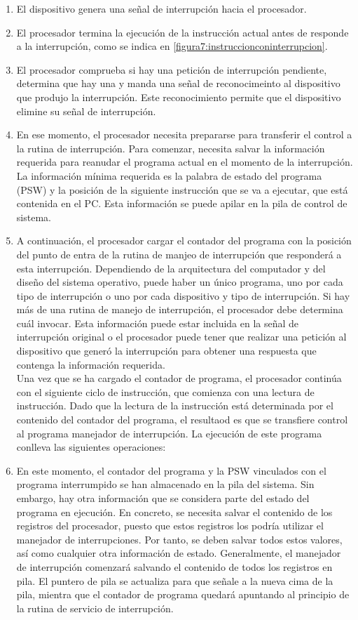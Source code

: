\documentclass{article}
\begin{document}
						\begin{enumerate}
							\item El dispositivo genera una señal de interrupción hacia el procesador.
							\item El procesador termina la ejecución de la instrucción actual antes de responde a la interrupción, como se indica en \ref{figura7:instruccionconinterrupcion}.
							\item El procesador comprueba si hay una petición de interrupción pendiente, determina que hay una y manda una señal de reconocimeinto al dispositivo que produjo la interrupción. Este reconocimiento permite que el dispositivo elimine su señal de interrupción.
							\item En ese momento, el procesador necesita prepararse para transferir el control a la rutina de interrupción. Para comenzar, necesita salvar la información requerida para reanudar el programa actual en el momento de la interrupción. La información mínima requerida es la palabra de estado del programa (PSW) y la posición de la siguiente instrucción que se va a ejecutar, que está contenida en el PC. Esta información se puede apilar en la pila de control de sistema.
							\item A continuación, el procesador cargar el contador del programa con la posición del punto de entra de la rutina de manjeo de interrupción que responderá a esta interrupción. Dependiendo de la arquitectura del computador y del diseño del sistema operativo, puede haber un único programa, uno por cada tipo de interrupción o uno por cada dispositivo y tipo de interrupción. Si hay más de una rutina de manejo de interrupción, el procesador debe determina cuál invocar. Esta información puede estar incluida en la señal de interrupción original o el procesador puede tener que realizar una petición al dispositivo que generó la interrupción para obtener una respuesta que contenga la información requerida. \\ 
							
							Una vez que se ha cargado el contador de programa, el procesador continúa con el siguiente ciclo de instrucción, que comienza con una lectura de instrucción. Dado que la lectura de la instrucción está determinada por el contenido del contador del programa, el resultaod es que se transfiere control al programa manejador de interrupción. La ejecución de este programa conlleva las siguientes operaciones: 
							\item En este momento, el contador del programa y la PSW vinculados con el programa interrumpido se han almacenado en la pila del sistema. Sin embargo, hay otra información que se considera parte del estado del programa en ejecución. En concreto, se necesita salvar el contenido de los registros del procesador, puesto que estos registros los podría utilizar el manejador de interrupciones. Por tanto, se deben salvar todos estos valores, así como cualquier otra información de estado. Generalmente, el manejador de interrupción comenzará salvando el contenido de todos los registros en pila. El puntero de pila se actualiza para que señale a la nueva cima de la pila, mientra que el contador de programa quedará apuntando al principio de la rutina de servicio de interrupción.
							

\end{enumerate}
\end{document}
